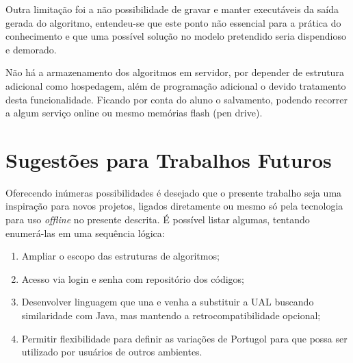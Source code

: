 Outra limitação foi a não possibilidade de gravar e manter executáveis da saída gerada do algoritmo, entendeu-se que este ponto não essencial para a prática do conhecimento e que uma possível solução no modelo pretendido seria dispendioso e demorado.

Não há a armazenamento dos algoritmos em servidor, por depender de estrutura adicional como hospedagem, além de programação adicional o devido tratamento desta funcionalidade. Ficando por conta do aluno o salvamento, podendo recorrer a algum serviço online ou mesmo memórias flash (pen drive).


\section{Sugestões para Trabalhos Futuros}

Oferecendo inúmeras possibilidades é desejado que o presente trabalho seja uma inspiração para novos projetos, ligados diretamente ou mesmo só pela tecnologia para uso \textit{offline} no presente descrita. É possível listar algumas, tentando enumerá-las em uma sequência lógica:

\begin{enumerate}

\item Ampliar o escopo das estruturas de algoritmos;
\item Acesso via login e senha com repositório dos códigos;
\item Desenvolver linguagem que una e venha a substituir a UAL buscando similaridade com Java, mas mantendo a retrocompatibilidade opcional;
\item Permitir flexibilidade para definir as variações de Portugol para que possa ser utilizado por usuários de outros ambientes.

\end{enumerate}
